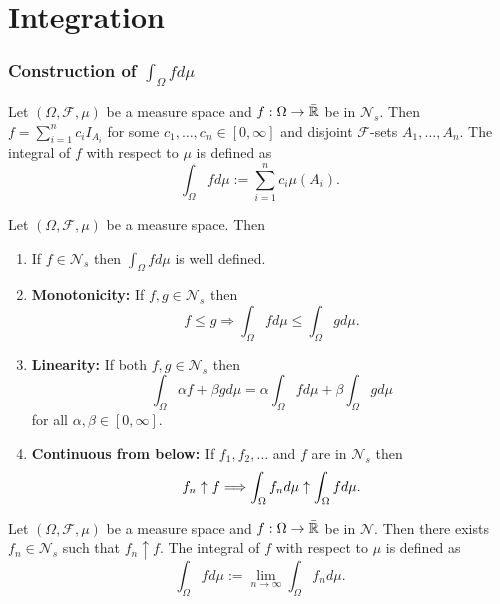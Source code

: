 \part{Integration}


\section{Construction of $\int_\Omega f d\mu$}


\begin{definition}
Let $(\Omega, \mathcal F, \mu)$ be a measure space and $f:\Omega\rightarrow \bar{\Bbb R}$ be in $\mathscr N_s$.  Then $f=\sum_{i=1}^n c_i I_{A_i}$ for some $c_1,\ldots, c_n \in[0,\infty]$ and disjoint $\mathcal F$-sets $A_1,\ldots, A_n$. The  integral of $f$ with respect to $\mu$ is defined as
\[ \int_{\Omega} f d\mu:= \sum_{i=1}^n c_i \mu(A_i). \]
\end{definition}


\begin{theorem}
Let $(\Omega, \mathcal F, \mu)$ be a measure space. Then
\begin{enumerate}
\item If $f\in \mathscr N_s$ then $\int_\Omega f d\mu$ is well defined.
\item {\bf Monotonicity:} If $f, g\in \mathscr N_s$ then
\[ \text{$f\leq g$}\Longrightarrow \int_\Omega fd\mu\leq \int_\Omega g d\mu.  \]
\item {\bf Linearity:}
If both $f, g\in \mathscr N_s$ then
\begin{equation}
\label{llin}
\int_\Omega \alpha f + \beta g d\mu =  \alpha \int_\Omega fd\mu + \beta \int_\Omega gd\mu
\end{equation}
for all $ \alpha, \beta\in[0,\infty]$.
\item {\bf Continuous from below:} If $f_1, f_2,\ldots$ and $f$ are in $\mathscr N_s$ then
\[ \text{$ f_n\uparrow f$}\Longrightarrow \int_\Omega f_n d\mu\uparrow \int_\Omega f d\mu.  \]
\end{enumerate}
\end{theorem}




\begin{definition}
Let $(\Omega, \mathcal F, \mu)$ be a measure space and $f:\Omega\rightarrow \bar{\Bbb R}$ be in $\mathscr N$. Then  there exists $f_n\in\mathscr N_s$ such that $f_n\uparrow f$.
The integral of $f$ with respect to $\mu$ is defined as
\[ \int_{\Omega} f d\mu:=\lim_{n\rightarrow \infty} \int_\Omega f_n d\mu. \]
\end{definition}




